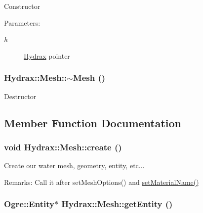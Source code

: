 \begin{CompactItemize}
Constructor \begin{Desc}
\item[Parameters:]
\begin{description}
\item[{\em h}]\hyperlink{class_hydrax_1_1_hydrax}{Hydrax} pointer \end{description}
\end{Desc}
\hypertarget{class_hydrax_1_1_mesh_3f2ca0de1fa86ed289bf062ceaadb553}{
\subsubsection[{$\sim$Mesh}]{\setlength{\rightskip}{0pt plus 5cm}Hydrax::Mesh::$\sim$Mesh ()}}
\label{class_hydrax_1_1_mesh_3f2ca0de1fa86ed289bf062ceaadb553}


Destructor 

\subsection{Member Function Documentation}
\hypertarget{class_hydrax_1_1_mesh_202f11f0f3c109cb93c516fe83f1dc0d}{
\subsubsection[{create}]{\setlength{\rightskip}{0pt plus 5cm}void Hydrax::Mesh::create ()}}
\label{class_hydrax_1_1_mesh_202f11f0f3c109cb93c516fe83f1dc0d}


Create our water mesh, geometry, entity, etc... \begin{Desc}
\item[Remarks:]Call it after setMeshOptions() and \hyperlink{class_hydrax_1_1_mesh_43b930f0d0e03f95799de998780727cc}{setMaterialName()} \end{Desc}
\hypertarget{class_hydrax_1_1_mesh_a50c84e94aea20428cd56835cd6d26c3}{
\subsubsection[{getEntity}]{\setlength{\rightskip}{0pt plus 5cm}Ogre::Entity$\ast$ Hydrax::Mesh::getEntity ()}}
\label{class_hydrax_1_1_mesh_a50c84e94aea20428cd56835cd6d26c3}



\end{CompactItemize}
